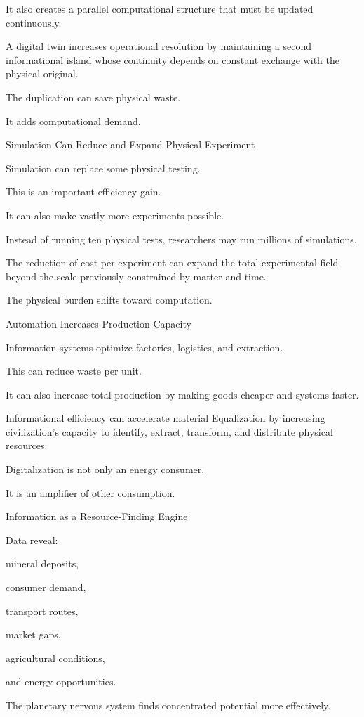 It also creates a parallel computational structure that must be updated continuously.

A digital twin increases operational resolution by maintaining a second informational island whose continuity depends on constant exchange with the physical original.

The duplication can save physical waste.

It adds computational demand.

Simulation Can Reduce and Expand Physical Experiment

Simulation can replace some physical testing.

This is an important efficiency gain.

It can also make vastly more experiments possible.

Instead of running ten physical tests, researchers may run millions of simulations.

The reduction of cost per experiment can expand the total experimental field beyond the scale previously constrained by matter and time.

The physical burden shifts toward computation.

Automation Increases Production Capacity

Information systems optimize factories, logistics, and extraction.

This can reduce waste per unit.

It can also increase total production by making goods cheaper and systems faster.

Informational efficiency can accelerate material Equalization by increasing civilization’s capacity to identify, extract, transform, and distribute physical resources.

Digitalization is not only an energy consumer.

It is an amplifier of other consumption.

Information as a Resource-Finding Engine

Data reveal:

mineral deposits,

consumer demand,

transport routes,

market gaps,

agricultural conditions,

and energy opportunities.

The planetary nervous system finds concentrated potential more effectively.

